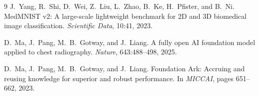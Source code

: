 \documentclass[11pt,a4paper]{article}
\begin{document}
\begin{thebibliography}{9}
J.~Yang, R.~Shi, D.~Wei, Z.~Liu, L.~Zhao, B.~Ke, H.~Pfister, and B.~Ni.
MedMNIST v2: A large-scale lightweight benchmark for 2D and 3D biomedical
image classification. \textit{Scientific Data}, 10:41, 2023.

D.~Ma, J.~Pang, M.~B.~Gotway, and J.~Liang. A fully open AI foundation model
applied to chest radiography. \textit{Nature}, 643:488--498, 2025.

D.~Ma, J.~Pang, M.~B.~Gotway, and J.~Liang. Foundation Ark: Accruing and
reusing knowledge for superior and robust performance. In \textit{MICCAI},
pages 651--662, 2023.
\end{thebibliography}
\end{document}
